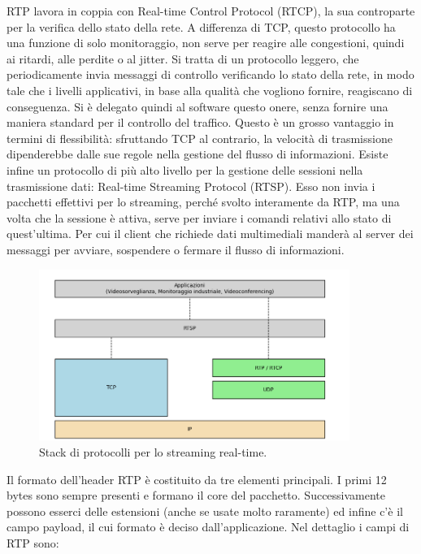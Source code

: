 RTP lavora in coppia con Real-time Control Protocol (RTCP), la sua controparte per la verifica dello stato della rete. A differenza di TCP, questo protocollo ha una funzione di solo monitoraggio, non serve per reagire alle congestioni, quindi ai ritardi, alle perdite o al jitter. Si tratta di un protocollo leggero, che periodicamente invia messaggi di controllo verificando lo stato della rete, in modo tale che i livelli applicativi, in base alla qualità che vogliono fornire, reagiscano di conseguenza. Si è delegato quindi al software questo onere, senza fornire una maniera standard per il controllo del traffico. Questo è un grosso vantaggio in termini di flessibilità: sfruttando TCP al contrario, la velocità di trasmissione dipenderebbe dalle sue regole nella gestione del flusso di informazioni. Esiste infine un protocollo di più alto livello per la gestione delle sessioni nella trasmissione dati: Real-time Streaming Protocol (RTSP). Esso non invia i pacchetti effettivi per lo streaming, perché svolto interamente da RTP, ma una volta che la sessione è attiva, serve per inviare i comandi relativi allo stato di quest'ultima. Per cui il client che richiede dati multimediali manderà al server dei messaggi per avviare, sospendere o fermare il flusso di informazioni.


\begin{figure}[htbp]
    \centering
    \includegraphics[width=0.9\textwidth]{figures/streaming_stack.png}
    \caption{Stack di protocolli per lo streaming real-time.}
    \label{straming-stack}
\end{figure}

Il formato dell'header RTP è costituito da tre elementi principali. I primi 12 bytes sono sempre presenti e formano il core del pacchetto. Successivamente possono esserci delle estensioni (anche se usate molto raramente) ed infine c'è il campo payload, il cui formato è deciso dall'applicazione. Nel dettaglio i campi di RTP sono:

